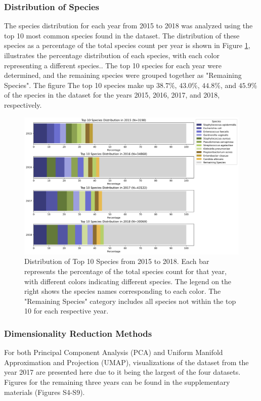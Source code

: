 \documentclass[english,11pt,a4paper,titlepage]{article}
\begin{document}
\subsubsection*{Distribution of Species}
The species distribution for each year from 2015 to 2018 was analyzed using the top 10 most common species found in the dataset. The distribution of these species as a percentage of the total species count per year is shown in Figure \ref{fig:species_distribution}, illustrates the percentage distribution of each species, with each color representing a different species.. 
The top 10 species for each year were determined, and the remaining species were grouped together as "Remaining Species". The figure  The top 10 species make up \( 38.7\% \), \( 43.0\% \), \( 44.8\% \), and \( 45.9\% \) of the species in the dataset for the years 2015, 2016, 2017, and 2018, respectively.
\begin{figure}[h]
	\centering
	\includegraphics[width=0.9\linewidth]{img/species_distribution.png}
	\caption{Distribution of Top 10 Species from 2015 to 2018. Each bar represents the percentage of the total species count for that year, with different colors indicating different species. The legend on the right shows the species names corresponding to each color. The "Remaining Species" category includes all species not within the top 10 for each respective year.}
	\label{fig:species_distribution}
\end{figure}

\subsubsection*{Dimensionality Reduction Methods}
For both Principal Component Analysis (PCA) and Uniform Manifold Approximation and Projection (UMAP), visualizations of the dataset from the year 2017 are presented here due to it being the largest of the four datasets. Figures for the remaining three years can be found in the supplementary materials (Figures S4-S9).
\end{document}
